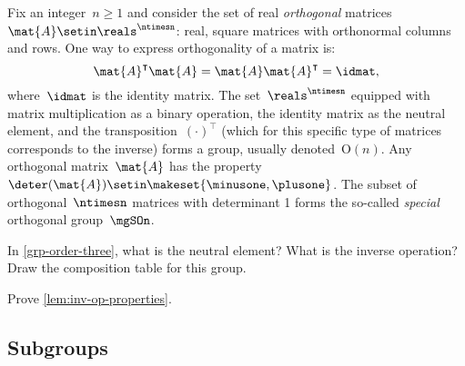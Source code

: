 \begin{example}

    Fix an integer~$n\geq 1$ and consider the set of real \emph{orthogonal} matrices~$\mat{A}\setin \reals^{\ntimesn}$:
    real, square matrices with orthonormal columns and rows.
    One way to express orthogonality of a matrix is:
    \begin{equation}
        \mat{A}^\intercal \mat{A}=\mat{A}\mat{A}^\intercal = \idmat,
    \end{equation}
    where~$\idmat$ is the identity matrix.
    The set~$\reals^{\ntimesn}$ equipped with matrix multiplication as a binary operation, the identity matrix as the neutral element, and the transposition~$(\cdot)^\intercal$ (which for this specific type of matrices corresponds to the inverse) forms a group, usually denoted~$\text{O}(n)$.
    Any orthogonal matrix~$\mat{A}$ has the property~$\deter(\mat{A})\setin \makeset{\minusone,\plusone}$.
    The subset of orthogonal~$\ntimesn$ matrices with determinant 1 forms the so-called \emph{special} orthogonal group~$\mgSOn$.
\end{example}

\vfill%

\begin{gradedexercise}
    \label{ex:GroupWithThreeElements}
    In \cref{grp-order-three}, what is the neutral element?
    What is the inverse operation?
    Draw the composition table for this group.
\end{gradedexercise}


\begin{gradedexercise}
    \label{ex:GroupInverseProperties}
    Prove \cref{lem:inv-op-properties}.
\end{gradedexercise}


\subsection{Subgroups}


